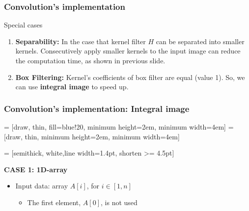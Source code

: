 \documentclass[english,11pt,table,handout]{beamer}
\begin{document}
{
	\frametitle{Convolution's implementation}
	\begin{alertblock}{Special cases}
		\begin{enumerate}
			\item \textbf{Separability:} In the case that kernel filter $H$ can be separated into smaller kernels. Consecutively apply smaller kernels to the input image can reduce the computation time, as shown in previous slide.
			\item \textbf{Box Filtering: } Kernel's coefficients of box filter are equal (value 1). So, we can use \textbf{integral image} to speed up.
		\end{enumerate}

	\end{alertblock}
}
\frame
{
	\frametitle{Convolution's implementation: Integral image}
	
	 = [draw, thin, fill=blue!20, minimum height=2em, minimum width=4em]
	 = [draw, thin, minimum height=2em, minimum width=4em]
	
	 = [semithick, white,line width=1.4pt, shorten >= 4.5pt]
	
	\textbf{CASE 1: 1D-array}
	\begin{itemize}
		\item Input data: array $A[i]$, for $i\in [1,n]$
		\begin{itemize}
			\item The first element, $A[0]$, is not used
		\end{itemize}
	\end{itemize}
	
		
}
\end{document}
